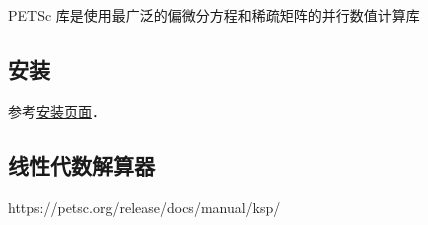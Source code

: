 
PETSc 库是使用最广泛的偏微分方程和稀疏矩阵的并行数值计算库

\subsection{安装}
参考\href{https://petsc.org/release/install/install_tutorial/}{安装页面}．


\subsection{线性代数解算器}
https://petsc.org/release/docs/manual/ksp/
